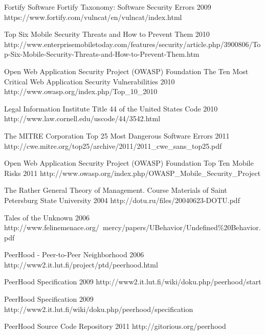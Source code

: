 \begin{thebibliography}{9}
		{Fortify Software}
		{Fortify Taxonomy: Software Security Errors}
		{2009}
		{https://www.fortify.com/vulncat/en/vulncat/index.html}
		
		{}
		{Top Six Mobile Security Threats and How to Prevent Them}
		{2010}
		{http://www.enterprisemobiletoday.com/features/security/article.php/3900806/Top-Six-Mobile-Security-Threats-and-How-to-Prevent-Them.htm}
		
		{Open Web Application Security Project (OWASP) Foundation}
		{The Ten Most Critical Web Application Security Vulnerabilities}
		{2010}
		{http://www.owasp.org/index.php/Top_10_2010}

		{Legal Information Institute}
		{Title 44 of the United States Code}
		{2010}
		{http://www.law.cornell.edu/uscode/44/3542.html}
	
		{The MITRE Corporation}
		{Top 25 Most Dangerous Software Errors}
		{2011}
		{http://cwe.mitre.org/top25/archive/2011/2011_cwe_sans_top25.pdf}
		
		{Open Web Application Security Project (OWASP) Foundation}
		{Top Ten Mobile Risks}
		{2011}
		{http://www.owasp.org/index.php/OWASP_Mobile_Security_Project}


		{The Rather General Theory of Management. Course Materials of Saint Petersburg State
			University}
		{2004}
		{http://dotu.ru/files/20040623-DOTU.pdf}

		{Tales of the Unknown}
		{2006}
		{http://www.felinemenace.org/~mercy/papers/UBehavior/Undefined\%20Behavior.pdf}

		{PeerHood - Peer-to-Peer Neighborhood}
		{2006}
		{http://www2.it.lut.fi/project/ptd/peerhood.html}		

		{PeerHood Specification}
		{2009}
		{http://www2.it.lut.fi/wiki/doku.php/peerhood/start}

		{PeerHood Specification}
		{2009}
		{http://www2.it.lut.fi/wiki/doku.php/peerhood/specification}

		{PeerHood Source Code Repository}
		{2011}
		{http://gitorious.org/peerhood}
	

\end{thebibliography}
